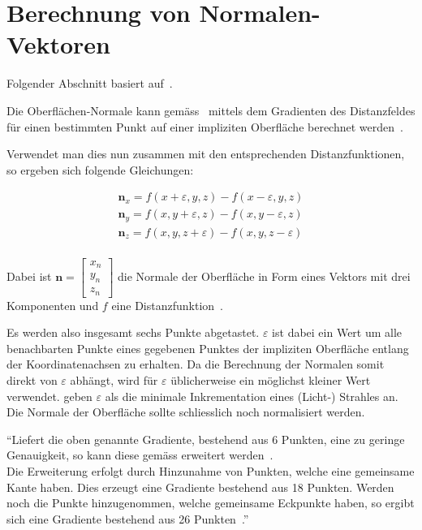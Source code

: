 \section{Berechnung von Normalen-Vektoren}
\label{sec:rendering:normals}

Folgender Abschnitt basiert auf~\cite[S. 42 bis
43]{osterwalder_sven_volume_2016}.

Die Oberflächen-Normale kann gemäss~\citeauthor{hart_ray_1989} mittels dem
Gradienten des Distanzfeldes für einen bestimmten Punkt auf einer impliziten
Oberfläche berechnet werden~\parencite[S. 292 bis 293]{hart_ray_1989}.

Verwendet man dies nun zusammen mit den entsprechenden Distanzfunktionen, so
ergeben sich folgende Gleichungen:

\begin{gather}
    \bm{n}_{x} = f(x + \varepsilon, y, z) - f(x - \varepsilon, y, z) \\
    \bm{n}_{y} = f(x, y + \varepsilon,  z) - f(x, y - \varepsilon,  z) \\
    \bm{n}_{z} = f(x, y, z + \varepsilon) - f(x, y, z - \varepsilon) \\
\end{gather}

Dabei ist $\bm{n} = \begin{bmatrix} x_{n} \\ y_{n} \\ z_{n} \end{bmatrix}$ die
Normale der Oberfläche in Form eines Vektors mit drei Komponenten und $f$ eine
Distanzfunktion~\parencites[S. 292 bis 293]{hart_ray_1989}[S.
13]{hart_ray_1993}.

Es werden also insgesamt sechs Punkte abgetastet. $\varepsilon$ ist dabei ein
Wert um alle benachbarten Punkte eines gegebenen Punktes der impliziten
Oberfläche entlang der Koordinatenachsen zu erhalten. Da die Berechnung der
Normalen somit direkt von $\varepsilon$ abhängt, wird für $\varepsilon$
üblicherweise ein möglichst kleiner Wert verwendet.  \citeauthor{hart_ray_1989}
geben $\varepsilon$ als die minimale Inkrementation eines (Licht-) Strahles an.
Die Normale der Oberfläche sollte schliesslich noch normalisiert werden.

``Liefert die oben genannte Gradiente, bestehend aus 6 Punkten, eine zu
geringe Genauigkeit, so kann diese gemäss \citeauthor{hart_ray_1989}
erweitert werden~\parencite[S. 293]{hart_ray_1989}.\\
Die Erweiterung erfolgt durch Hinzunahme von Punkten, welche eine
gemeinsame Kante haben. Dies erzeugt eine Gradiente bestehend aus 18
Punkten. Werden noch die Punkte hinzugenommen, welche gemeinsame
Eckpunkte haben, so ergibt sich eine Gradiente bestehend aus 26
Punkten~\parencite[S. 293]{hart_ray_1989}.''~\cite[S.
43]{osterwalder_sven_volume_2016}

